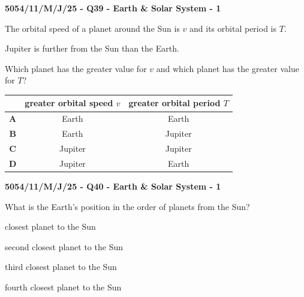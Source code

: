 \documentclass[11pt,a4paper]{article}
\newcommand{\swmarks}{}
\newcommand{\examq}[4]{%
  \gdef\swmarks{#4}%
  \par\addvspace{16pt}\noindent
  {\large\bfseries #1 - Q#2 - #3 - #4}\par\vspace{5pt}%
}
\begin{document}
\examq{5054/11/M/J/25}{39}{Earth \& Solar System}{1}
The orbital speed of a planet around the Sun is $v$ and its orbital period is $T$.

Jupiter is further from the Sun than the Earth.

Which planet has the greater value for $v$ and which planet has the greater value for $T$?

\begin{center}
\begin{tabular}{|c|c|c|}
\hline
 & \makecell{greater orbital\\speed $v$} & \makecell{greater orbital\\period $T$}\\
\hline
\textbf{A} & Earth & Earth\\
\hline
\textbf{B} & Earth & Jupiter\\
\hline
\textbf{C} & Jupiter & Jupiter\\
\hline
\textbf{D} & Jupiter & Earth\\
\hline
\end{tabular}
\end{center}

\examq{5054/11/M/J/25}{40}{Earth \& Solar System}{1}
What is the Earth's position in the order of planets from the Sun?

\begin{choices}
  \item closest planet to the Sun
  \item second closest planet to the Sun
  \item third closest planet to the Sun
  \item fourth closest planet to the Sun
\end{choices}
\end{document}
